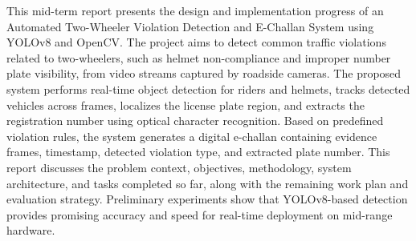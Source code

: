 This mid-term report presents the design and implementation progress of an Automated Two-Wheeler Violation Detection and E-Challan System using YOLOv8 and OpenCV. The project aims to detect common traffic violations related to two-wheelers, such as helmet non-compliance and improper number plate visibility, from video streams captured by roadside cameras. The proposed system performs real-time object detection for riders and helmets, tracks detected vehicles across frames, localizes the license plate region, and extracts the registration number using optical character recognition. Based on predefined violation rules, the system generates a digital e-challan containing evidence frames, timestamp, detected violation type, and extracted plate number. This report discusses the problem context, objectives, methodology, system architecture, and tasks completed so far, along with the remaining work plan and evaluation strategy. Preliminary experiments show that YOLOv8-based detection provides promising accuracy and speed for real-time deployment on mid-range hardware.
